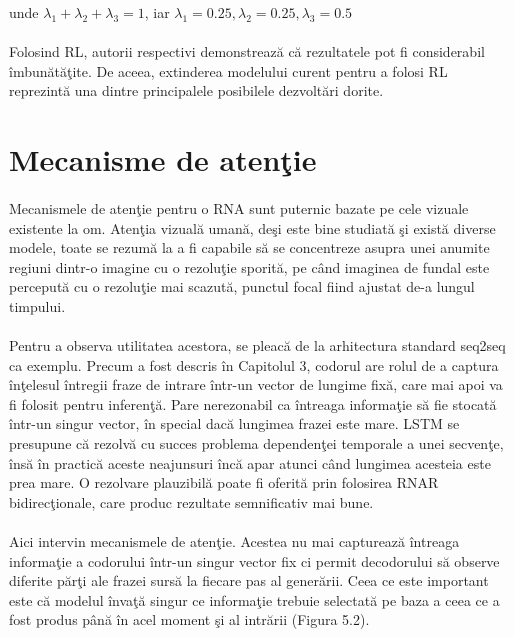 unde \(\lambda_1 + \lambda_2 + \lambda_3 = 1\), iar \(\lambda_1 = 0.25, \lambda_2 = 0.25, \lambda_3 = 0.5\)

\paragraph{}
Folosind RL, autorii respectivi demonstreaz\u a c\u a rezultatele pot fi considerabil \^ imbun\u at\u a\c tite. De aceea, extinderea modelului curent pentru a folosi RL reprezint\u a una dintre principalele posibilele dezvolt\u ari dorite.

\section{Mecanisme de aten\c tie}

\paragraph{}
Mecanismele de aten\c tie \cite{DBLP:journals/corr/BahdanauCB14} pentru o RNA sunt puternic bazate pe cele vizuale existente la om. Aten\c tia vizual\u a uman\u a, de\c si este bine studiat\u a \c si exist\u a diverse modele, toate se rezum\u a la a fi capabile s\u a se concentreze asupra unei anumite regiuni dintr-o imagine cu o rezolu\c tie sporit\u a, pe c\^ and imaginea de fundal este perceput\u a cu o rezolu\c tie mai scazut\u a, punctul focal fiind ajustat de-a lungul timpului. 

\paragraph{}
Pentru a observa utilitatea acestora, se pleac\u a de la arhitectura standard seq2seq ca exemplu. Precum a fost descris \^ in Capitolul 3, codorul are rolul de a captura \^ in\c telesul \^ intregii fraze de intrare \^ intr-un vector de lungime fix\u a, care mai apoi va fi folosit pentru inferen\c t\u a. Pare nerezonabil ca \^ intreaga informa\c tie s\u a fie stocat\u a \^ intr-un singur vector, \^ in special dac\u a lungimea frazei este mare. LSTM se presupune c\u a rezolv\u a cu succes problema dependen\c tei temporale a unei secven\c te, \^ ins\u a \^ in practic\u a aceste neajunsuri \^ inc\u a apar atunci c\^ and lungimea acesteia este prea mare. O rezolvare plauzibil\u a poate fi oferit\u a prin folosirea RNAR bidirec\c tionale, care produc rezultate semnificativ mai bune. 

\paragraph{}
Aici intervin mecanismele de aten\c tie. Acestea nu mai captureaz\u a \^ intreaga informa\c tie a codorului \^ intr-un singur vector fix ci permit decodorului s\u a observe diferite p\u ar\c ti ale frazei surs\u a la fiecare pas al gener\u arii. Ceea ce este important este c\u a modelul \^ inva\c t\u a singur ce informa\c tie trebuie selectat\u a pe baza a ceea ce a fost produs p\^ an\u a \^ in acel moment \c si al intr\u arii (Figura 5.2).

